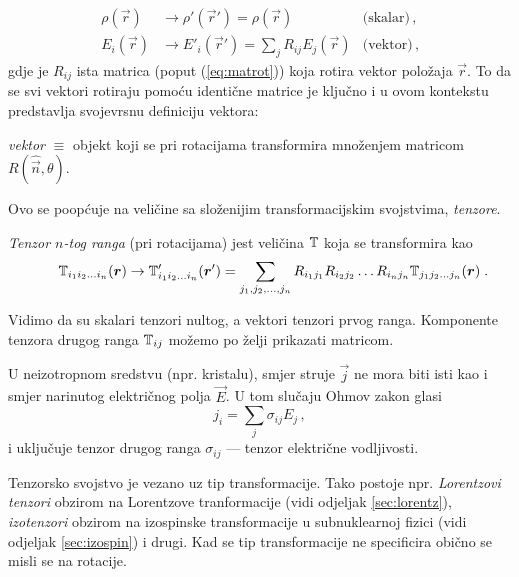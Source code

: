 \vspace*{2ex}
\centerline{}

\begin{align*}
    \rho(\vec{r}) &\to \rho'(\vec{r}') = \rho(\vec{r}) \qquad &\textrm{(skalar)} \,, \\
    E_i(\vec{r}) &\to E'_i(\vec{r}') = \sum_j R_{ij}E_j(\vec{r}) 
                 &\textrm{(vektor)} \,,
\end{align*}
gdje je $R_{ij}$ ista matrica (poput (\ref{eq:matrot})) koja rotira
vektor položaja $\vec{r}$. To da se svi vektori rotiraju pomoću identične
matrice je ključno i u ovom kontekstu predstavlja svojevrsnu definiciju
vektora:
\begin{center}
    \emph{vektor} $\equiv$ {objekt koji se pri rotacijama transformira množenjem matricom}
    $R(\hat{\vec{n}}, \theta)$.
\end{center}
Ovo se poopćuje na veličine sa složenijim transformacijskim svojstvima,
\emph{tenzore}.  
\begin{definicija}[Tenzor]
\label{def:tenzor}
\emph{Tenzor $n$-tog ranga} (pri rotacijama)  jest veličina $\mathbb{T}$  koja
se transformira kao
\begin{equation}
 \qquad \bbtensor{T}_{i_1 i_2 \ldots i_n}(\vec{r}) \to \bbtensor{T}'_{i_1 i_2 \ldots i_n}(\vec{r}') =
\sum_{j_1, j_2, \ldots, j_n}
  R_{i_1 j_1}  R_{i_2 j_2} \ldots  R_{i_n j_n} \bbtensor{T}_{j_1 j_2 \ldots j_n}(\vec{r})
 \; . 
 \label{eq:tenzor}
\end{equation}
\end{definicija}

Vidimo da su skalari tenzori nultog, a vektori tenzori prvog ranga.
Komponente tenzora drugog ranga $\mathbb{T}_{ij}$
možemo po želji prikazati matricom.

\begin{primjer}
U neizotropnom sredstvu (npr. kristalu), smjer struje $\vec{j}$ ne mora biti isti
kao i smjer narinutog električnog polja $\vec{E}$. U tom slučaju Ohmov zakon
glasi
\begin{equation*}
j_i = \sum_j \sigma_{ij} E_j \,,
\end{equation*}
i uključuje tenzor drugog ranga $\sigma_{ij}$ --- tenzor električne vodljivosti.
\label{pr:tenzorvodljivosti}
\end{primjer}

Tenzorsko svojstvo je vezano uz tip transformacije. Tako postoje
npr. \emph{Lorentzovi tenzori} obzirom na Lorentzove tranformacije
(vidi odjeljak \ref{sec:lorentz}), \emph{izotenzori} obzirom na
izospinske transformacije u subnuklearnoj fizici (vidi odjeljak
\ref{sec:izospin}) i drugi.
Kad se tip transformacije ne specificira obično se misli se na rotacije.

